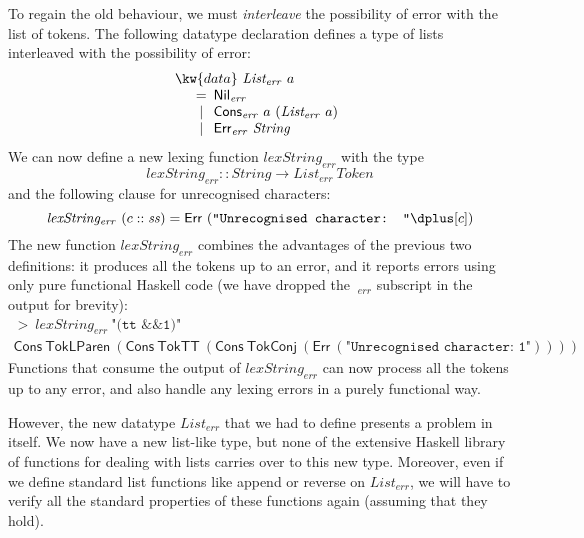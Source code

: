 To regain the old behaviour, we must \emph{interleave} the possibility
of error with the list of tokens. The following datatype declaration
defines a type of lists interleaved with the possibility of error:
\begin{displaymath}
  \begin{array}{l}
    \kw{data}~\mathit{List_{err}}~a \\
    \quad
    \begin{array}{c@{\hspace{0.5em}}l}
      = & \mathsf{Nil}_{\mathit{err}} \\
      | & \mathsf{Cons}_{\mathit{err}}~a~(\mathit{List_{err}}~a) \\
      | & \mathsf{Err}_{\mathit{err}}~\mathit{String}
    \end{array}
  \end{array}
\end{displaymath}
We can now define a new lexing function $\mathit{lexString_{err}}$ with the type
\begin{displaymath}
  \mathit{lexString_{err}} :: \mathit{String} \to \mathit{List_{err}}~\mathit{Token}
\end{displaymath}
and the following clause for unrecognised characters:
\begin{displaymath}
  \mathit{lexString_{err}}~(c :: \mathit{ss}) = \mathsf{Err}~(\texttt{"Unrecognised character: "} \dplus [c])
\end{displaymath}
The new function $\mathit{lexString_{err}}$ combines the advantages of
the previous two definitions: it produces all the tokens up to an
error, and it reports errors using only pure functional Haskell code
(we have dropped the $\ _{err}$ subscript in the output for brevity):
\begin{displaymath}
  \begin{array}{l}
    >~\mathit{lexString_{err}}~\texttt{"(tt \&\& 1)"} \\
    \mathsf{Cons}~\mathsf{TokLParen}~(\mathsf{Cons}~\mathsf{TokTT}~(\mathsf{Cons}~\mathsf{TokConj}~(\mathsf{Err}~(\texttt{"Unrecognised character: 1"}))))
  \end{array}
\end{displaymath}
Functions that consume the output of $\mathit{lexString_{err}}$ can
now process all the tokens up to any error, and also handle any lexing
errors in a purely functional way.

However, the new datatype $\mathit{List_{err}}$ that we had to define
presents a problem in itself. We now have a new list-like type, but
none of the extensive Haskell library of functions for dealing with
lists carries over to this new type. Moreover, even if we define
standard list functions like append or reverse on
$\mathit{List_{err}}$, we will have to verify all the standard
properties of these functions again (assuming that they hold).

